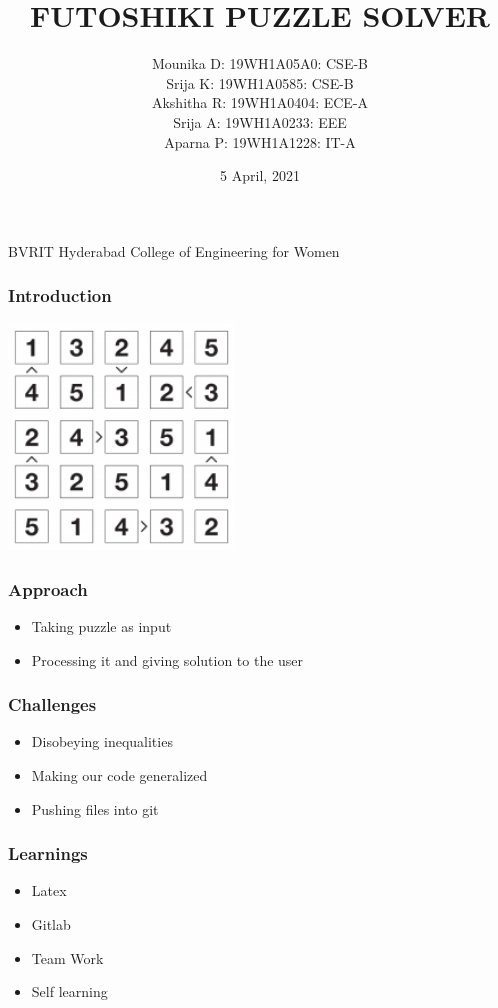 \documentclass[14pt]{beamer}
\title{FUTOSHIKI PUZZLE SOLVER}
\author[BVRIRH]{Mounika D: 19WH1A05A0: CSE-B \\ Srija K: 19WH1A0585: CSE-B \\ Akshitha R: 19WH1A0404: ECE-A \\Srija A: 19WH1A0233: EEE \\Aparna P: 19WH1A1228: IT-A}
\date{5 April, 2021}
\begin{document}
    \begin{frame}
        \titlepage
          \begin{center}
             \small{BVRIT Hyderabad College of Engineering for Women}
          \end{center}
    \end{frame}
    \begin{frame}
        \frametitle{Introduction}
        \includegraphics[width=6cm]{puzzle_photo.png}
    \end{frame}
    \begin{frame}
        \frametitle{Approach}
        \begin{itemize}
            \item Taking puzzle as input
            \item Processing it and giving solution to the user
        \end{itemize}
    \end{frame}
    \begin{frame}
        \frametitle{Challenges}
        \begin{itemize}
            \item Disobeying inequalities
            \item Making our code generalized
            \item Pushing files into git
        \end{itemize}
    \end{frame}
    \begin{frame}
          \frametitle{Learnings}
          \begin{itemize}
              \item{Latex}
              \item{Gitlab}
              \item{Team Work}
              \item{Self learning}
          \end{itemize}
    \end{frame}
\end{document}
